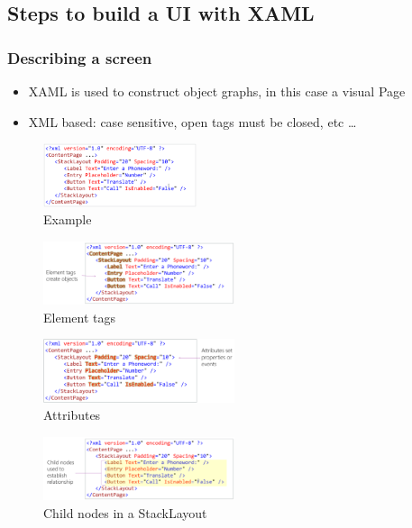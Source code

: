 \documentclass{article}
\begin{document}
\subsection{Steps to build a UI with XAML}

\subsubsection{Describing a screen}

\begin{itemize}
    \item XAML is used to construct object graphs, in this case a visual Page
    \item XML based: case sensitive, open tags must be closed, etc \dots
\end{itemize}

\begin{figure}[H]
    \centering
    \includegraphics[width=0.4\textwidth]{xaml01.png}
    \caption{Example}
\end{figure}

\begin{figure}[H]
    \centering
    \includegraphics[width=0.5\textwidth]{xaml02.png}
    \caption{Element tags}
\end{figure}

\begin{figure}[H]
    \centering
    \includegraphics[width=0.5\textwidth]{xaml03.png}
    \caption{Attributes}
\end{figure}

\begin{figure}[H]
    \centering
    \includegraphics[width=0.5\textwidth]{xaml04.png}
    \caption{Child nodes in a StackLayout}
\end{figure}
\end{document}
